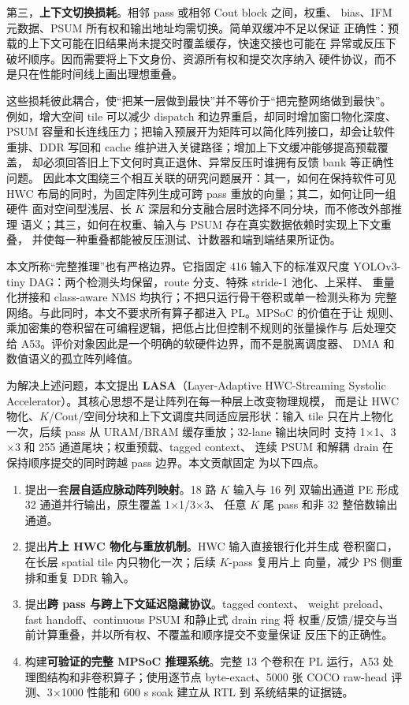 第三，\textbf{上下文切换损耗}。相邻 pass 或相邻 Cout block 之间，权重、
bias、IFM 元数据、PSUM 所有权和输出地址均需切换。简单双缓冲不足以保证
正确性：预载的上下文可能在旧结果尚未提交时覆盖缓存，快速交接也可能在
异常或反压下破坏顺序。因而需要将上下文身份、资源所有权和提交次序纳入
硬件协议，而不是只在性能时间线上画出理想重叠。

这些损耗彼此耦合，使“把某一层做到最快”并不等价于“把完整网络做到最快”。
例如，增大空间 tile 可以减少 dispatch 和边界重启，却同时增加窗口物化深度、
PSUM 容量和长连线压力；把输入预展开为矩阵可以简化阵列接口，却会让软件
重排、DDR 写回和 cache 维护进入关键路径；增加上下文缓冲能够提高预载覆盖，
却必须回答旧上下文何时真正退休、异常反压时谁拥有反馈 bank 等正确性问题。
因此本文围绕三个相互关联的研究问题展开：其一，如何在保持软件可见 HWC
布局的同时，为固定阵列生成可跨 pass 重放的向量；其二，如何让同一组硬件
面对空间型浅层、长 $K$ 深层和分支融合层时选择不同分块，而不修改外部推理
语义；其三，如何在权重、输入与 PSUM 存在真实数据依赖时实现上下文重叠，
并使每一种重叠都能被反压测试、计数器和端到端结果所证伪。

本文所称“完整推理”也有严格边界。它指固定 416 输入下的标准双尺度
YOLOv3-tiny DAG：两个检测头均保留，route 分支、特殊 stride-1 池化、上采样、
重量化拼接和 class-aware NMS 均执行；不把只运行骨干卷积或单一检测头称为
完整网络。与此同时，本文不要求所有算子都进入 PL。MPSoC 的价值在于让
规则、乘加密集的卷积留在可编程逻辑，把低占比但控制不规则的张量操作与
后处理交给 A53。评价对象因此是一个明确的软硬件边界，而不是脱离调度器、
DMA 和数值语义的孤立阵列峰值。

为解决上述问题，本文提出 \textbf{LASA}（Layer-Adaptive HWC-Streaming
Systolic Accelerator）。其核心思想不是让阵列在每一种层上改变物理规模，
而是让 HWC 物化、$K$/Cout/空间分块和上下文调度共同适应层形状：输入 tile
只在片上物化一次，后续 pass 从 URAM/BRAM 缓存重放；32-lane 输出块同时
支持 1$\times$1、3$\times$3 和 255 通道尾块；权重预载、tagged context、
连续 PSUM 和解耦 drain 在保持顺序提交的同时跨越 pass 边界。本文贡献固定
为以下四点。

\begin{enumerate}[leftmargin=2em]
  \item 提出一套\textbf{层自适应脉动阵列映射}。18 路 $K$ 输入与 16 列
  双输出通道 PE 形成 32 通道并行输出，原生覆盖 1$\times$1/3$\times$3、
  任意 $K$ 尾 pass 和非 32 整倍数输出通道。
  \item 提出\textbf{片上 HWC 物化与重放机制}。HWC 输入直接银行化并生成
  卷积窗口，在长层 spatial tile 内只物化一次；后续 $K$-pass 复用片上
  向量，减少 PS 侧重排和重复 DDR 输入。
  \item 提出\textbf{跨 pass 与跨上下文延迟隐藏协议}。tagged context、
  weight preload、fast handoff、continuous PSUM 和静止式 drain ring 将
  权重/反馈/提交与当前计算重叠，并以所有权、不覆盖和顺序提交不变量保证
  反压下的正确性。
  \item 构建\textbf{可验证的完整 MPSoC 推理系统}。完整 13 个卷积在 PL
  运行，A53 处理图结构和非卷积算子；使用逐节点 byte-exact、5000 张
  COCO raw-head 评测、3$\times$1000 性能和 600 s soak 建立从 RTL 到
  系统结果的证据链。
\end{enumerate}

